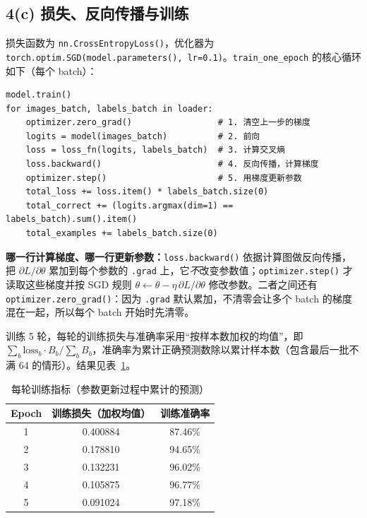 \documentclass[11pt,a4paper]{ctexart}
\begin{document}
\subsection{4(c) 损失、反向传播与训练}

损失函数为 \texttt{nn.CrossEntropyLoss()}，优化器为 \texttt{torch.optim.SGD(model.parameters(), lr=0.1)}。\texttt{train\_one\_epoch} 的核心循环如下（每个 batch）：

\begin{lstlisting}
model.train()
for images_batch, labels_batch in loader:
    optimizer.zero_grad()                 # 1. 清空上一步的梯度
    logits = model(images_batch)          # 2. 前向
    loss = loss_fn(logits, labels_batch)  # 3. 计算交叉熵
    loss.backward()                       # 4. 反向传播，计算梯度
    optimizer.step()                      # 5. 用梯度更新参数
    total_loss += loss.item() * labels_batch.size(0)
    total_correct += (logits.argmax(dim=1) == labels_batch).sum().item()
    total_examples += labels_batch.size(0)
\end{lstlisting}

\textbf{哪一行计算梯度、哪一行更新参数：}\texttt{loss.backward()} 依据计算图做反向传播，把 $\partial L/\partial\theta$ 累加到每个参数的 \texttt{.grad} 上，它\emph{不}改变参数值；\texttt{optimizer.step()} 才读取这些梯度并按 SGD 规则 $\theta\leftarrow\theta-\eta\,\partial L/\partial\theta$ 修改参数。二者之间还有 \texttt{optimizer.zero\_grad()}：因为 \texttt{.grad} 默认累加，不清零会让多个 batch 的梯度混在一起，所以每个 batch 开始时先清零。

训练 5 轮，每轮的训练损失与准确率采用“按样本数加权的均值”，即 $\sum_b \text{loss}_b\cdot B_b/\sum_b B_b$，准确率为累计正确预测数除以累计样本数（包含最后一批不满 64 的情形）。结果见表~\ref{tab:epoch}。

\begin{table}[H]
\centering
\caption{每轮训练指标（参数更新过程中累计的预测）}
\label{tab:epoch}
\begin{tabular}{ccc}
\toprule
Epoch & 训练损失（加权均值） & 训练准确率 \\
\midrule
1 & 0.400884 & 87.46\% \\
2 & 0.178810 & 94.65\% \\
3 & 0.132231 & 96.02\% \\
4 & 0.105875 & 96.77\% \\
5 & 0.091024 & 97.18\% \\
\bottomrule
\end{tabular}
\end{table}
\end{document}
